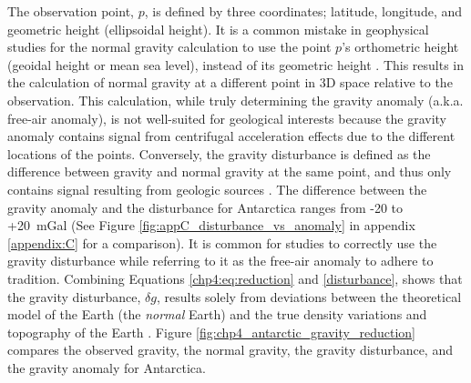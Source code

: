 The observation point, $p$, is defined by three coordinates; latitude, longitude, and geometric height (ellipsoidal height). It is a common mistake in geophysical studies for the normal gravity calculation to use the point $p$'s orthometric height (geoidal height or mean sea level), instead of its geometric height \citep{oliveirashould2018}. This results in the calculation of normal gravity at a different point in 3D space relative to the observation. This calculation, while truly determining the gravity anomaly (a.k.a. free-air anomaly), is not well-suited for geological interests because the gravity anomaly contains signal from centrifugal acceleration effects due to the different locations of the points. Conversely, the gravity disturbance is defined as the difference between gravity and normal gravity at the same point, and thus only contains signal resulting from geologic sources \citep{hofmann-wellenhofphysical2006}. The difference between the gravity anomaly and the disturbance for Antarctica ranges from -20 to +20~mGal (See Figure \ref{fig:appC_disturbance_vs_anomaly} in appendix \ref{appendix:C} for a comparison). It is common for studies to correctly use the gravity disturbance while referring to it as the free-air anomaly to adhere to tradition. Combining Equations \ref{chp4:eq:reduction} and \ref{disturbance}, shows that the gravity disturbance, $\delta g$, results solely from deviations between the theoretical model of the Earth (the \textit{normal} Earth) and the true density variations and topography of the Earth \citep{vajdaremoval2004}. Figure \ref{fig:chp4_antarctic_gravity_reduction} compares the observed gravity, the normal gravity, the gravity disturbance, and the gravity anomaly for Antarctica. \\

